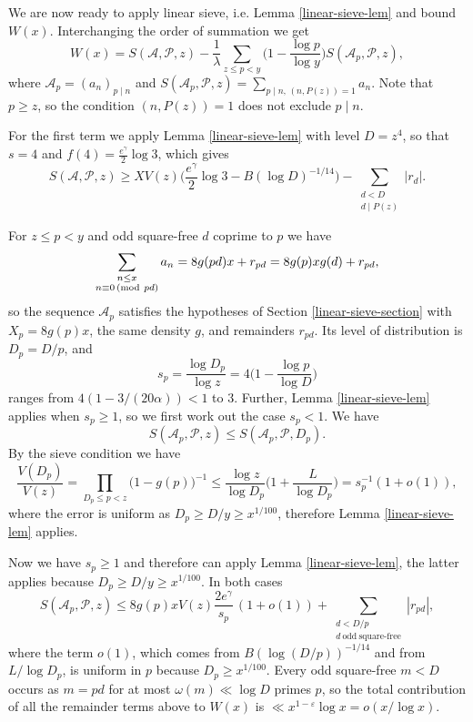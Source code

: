 \documentclass[12pt]{amsart}
\theoremstyle{remark}
\renewcommand{\pmod}[1]{\mkern3mu(\mathrm{mod}\ #1)}
\begin{document}
We are now ready to apply linear sieve, i.e. Lemma \ref{linear-sieve-lem} and bound $W(x)$.
Interchanging the order of summation we get
\[
    W(x) = S(\mathcal A,\mathcal P,z)-\frac{1}{\lambda} \sum_{z \le p< y}\biggl(1-\frac{\log p}{\log y}\biggr)S(\mathcal A_p,\mathcal P,z),
\]
where $\mathcal A_p=(a_n)_{p\mid n}$
and $S(\mathcal A_p,\mathcal P,z) = \sum_{p\mid n,\,(n,P(z))=1}a_n$.
Note that $p \ge z$, so the condition $(n,P(z)) = 1$ does not exclude $p \mid n$.

For the first term we apply Lemma \ref{linear-sieve-lem} with level $D = z^4$, so that $s=4$ and $f(4) = \tfrac{e^\gamma}{2}\log 3$, which gives
\[
    S(\mathcal A,\mathcal P,z)\ge XV(z)\biggl(\frac{e^\gamma}{2}\log 3 - B(\log D)^{-1/14} \biggr)-\sum_{\substack{d<D \\ d\mid P(z)}}|r_d| .
\]

For $z\le p<y$ and odd square-free $d$ coprime to $p$ we have
\[
    \sum_{\substack{n\le x\\ n\equiv 0 \pmod {pd}}} a_n = 8g(pd)x + r_{pd} = 8g(p)x g(d)+r_{pd},
\]
so the sequence $\mathcal A_p$ satisfies the hypotheses of Section \ref{linear-sieve-section} with $X_p = 8g(p)x$, the same density $g$, and remainders $r_{pd}$. Its level of distribution is $D_p = D/p$, and
\[
    s_p = \frac{\log D_p}{\log z} = 4\biggl(1-\frac{\log p}{\log D}\biggr)
\]
ranges from $4(1-3/(20\alpha)) < 1$ to $3$. 
Further, Lemma \ref{linear-sieve-lem} applies when $s_p \ge 1$, so we first work out the case $s_p < 1$. We have
\[
    S(\mathcal{A}_p, \mathcal{P},z) \le S(\mathcal{A}_p, \mathcal{P},D_p).
\]
By the sieve condition we have
\[
    \frac{V(D_p)}{V(z)} = \prod_{D_p \le p < z} \bigl(1-g(p) \bigr)^{-1} \le \frac{\log z}{\log D_p} \biggl( 1 + \frac{L}{\log D_p} \biggr) = s_p^{-1} (1+o(1)),
\]
where the error is uniform as $D_p \ge D/y \ge x^{1/100}$, therefore Lemma \ref{linear-sieve-lem} applies.


Now we have $s_p \ge 1$ and therefore can apply Lemma \ref{linear-sieve-lem}, the latter applies because $D_p \ge D/y\ge x^{1/100}$. In both cases
\[
    S(\mathcal A_p,\mathcal P,z) \le 8g(p)x V(z) \frac{2e^\gamma}{s_p}\,(1+o(1))+\sum_{\substack{d < D/p\\ d\ \mathrm{odd\ square\text{-}free}}}|r_{pd}| ,
\]
where the term $o(1)$, which comes from $B(\log(D/p))^{-1/14}$ and from $L/\log D_p$, is uniform in $p$ because $D_p\ge x^{1/100}$. Every odd square-free $m<D$ occurs as $m=pd$ for at most $\omega(m)\ll \log D$ primes $p$, so the total contribution of all the remainder terms above to $W(x)$ is $\ll x^{1-\varepsilon}\log x=o(x/\log x)$.
\end{document}
